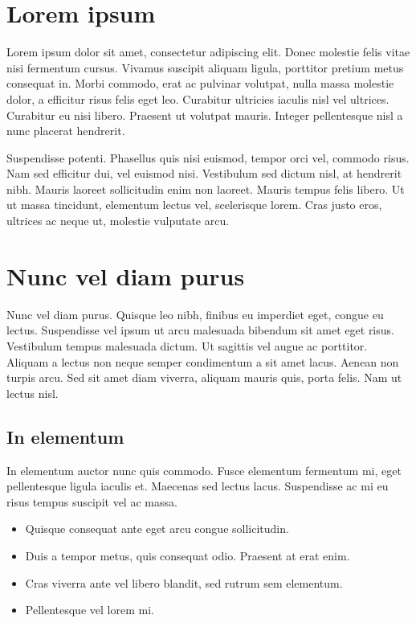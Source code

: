 \documentclass{ClassTeX}
\begin{document}
	\maketitle
	\section{Lorem ipsum}
	 Lorem ipsum dolor sit amet, consectetur adipiscing elit. Donec molestie felis vitae nisi fermentum cursus. Vivamus suscipit aliquam ligula, porttitor pretium metus consequat in. Morbi commodo, erat ac pulvinar volutpat, nulla massa molestie dolor, a efficitur risus felis eget leo. Curabitur ultricies iaculis nisl vel ultrices. Curabitur eu nisi libero. Praesent ut volutpat mauris. Integer pellentesque nisl a nunc placerat hendrerit.
	 
	 Suspendisse potenti. Phasellus quis nisi euismod, tempor orci vel, commodo risus. Nam sed efficitur dui, vel euismod nisi.  
	 Vestibulum sed dictum nisl, at hendrerit nibh. Mauris laoreet sollicitudin enim non laoreet. Mauris tempus felis libero. Ut ut massa tincidunt, elementum lectus vel, scelerisque lorem. Cras justo eros, ultrices ac neque ut, molestie vulputate arcu.
	 
	 \section{Nunc vel diam purus}
	 Nunc vel diam purus. Quisque leo nibh, finibus eu imperdiet eget, congue eu lectus. Suspendisse vel ipsum ut arcu malesuada bibendum sit amet eget risus. Vestibulum tempus malesuada dictum. Ut sagittis vel augue ac porttitor. Aliquam a lectus non neque semper condimentum a sit amet lacus. Aenean non turpis arcu. Sed sit amet diam viverra, aliquam mauris quis, porta felis. Nam ut lectus nisl.
	 \subsection{In elementum}
	 In elementum auctor nunc quis commodo. Fusce elementum fermentum mi, eget pellentesque ligula iaculis et. Maecenas sed lectus lacus. Suspendisse ac mi eu risus tempus suscipit vel ac massa. 
	 \begin{itemize}
	 	\item Quisque consequat ante eget arcu congue sollicitudin. 
	 	\item Duis a tempor metus, quis consequat odio. Praesent at erat enim. 
	 	\item Cras viverra ante vel libero blandit, sed rutrum sem elementum. 
	 	\item Pellentesque vel lorem mi. 
	 \end{itemize} 
	 
\end{document}
